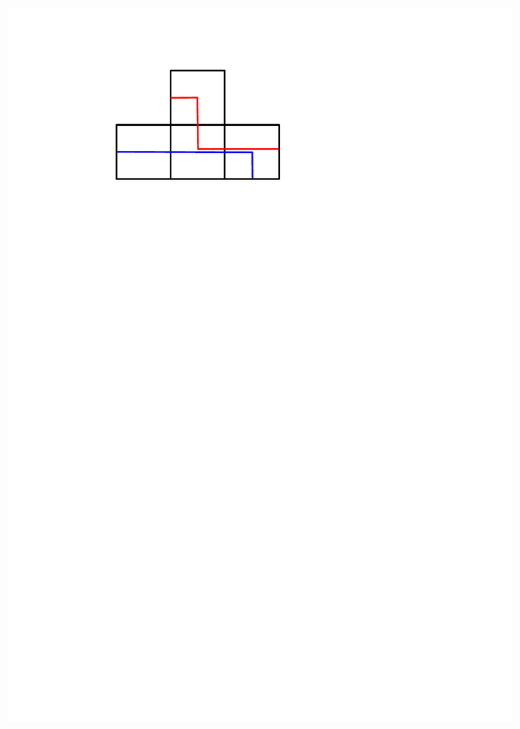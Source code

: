 \documentclass[portrait,final,a0paper,fontscale=0.25]{baposter}
\theoremstyle{definition}
\begin{document}
\begin{poster}
{\hspace*{.3cm}\includegraphics[scale=.3]{Kiss}
}
\end{poster}
\end{document}

